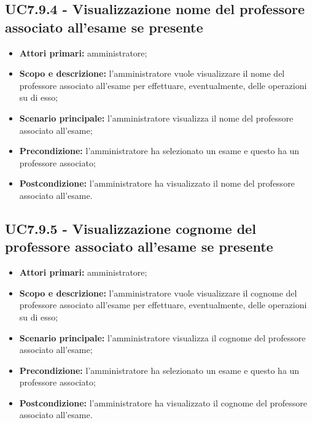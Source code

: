 \documentclass[AnalisiDeiRequisiti.tex]{subfiles}
\begin{document}
\subsection{UC7.9.4 - Visualizzazione nome del professore associato all'esame se presente}
\begin{itemize}
	\item \textbf{Attori primari:} amministratore;
	\item \textbf{Scopo e descrizione:} l'amministratore vuole visualizzare il nome del professore associato all'esame per effettuare, eventualmente, delle operazioni su di esso;
	\item \textbf{Scenario principale:} l'amministratore visualizza il nome del professore associato all'esame;
	\item \textbf{Precondizione:} l'amministratore ha selezionato un esame e questo ha un professore associato; 
	\item \textbf{Postcondizione:} l'amministratore ha visualizzato il nome del professore associato all'esame.
\end{itemize}
\subsection{UC7.9.5 - Visualizzazione cognome del professore associato all'esame se presente}
\begin{itemize}
	\item \textbf{Attori primari:} amministratore;
	\item \textbf{Scopo e descrizione:} l'amministratore vuole visualizzare il cognome del professore associato all'esame per effettuare, eventualmente, delle operazioni su di esso;
	\item \textbf{Scenario principale:} l'amministratore visualizza il cognome del professore associato all'esame;
	\item \textbf{Precondizione:} l'amministratore ha selezionato un esame e questo ha un professore associato; 
	\item \textbf{Postcondizione:} l'amministratore ha visualizzato il cognome del professore associato all'esame.
\end{itemize}
\end{document}
